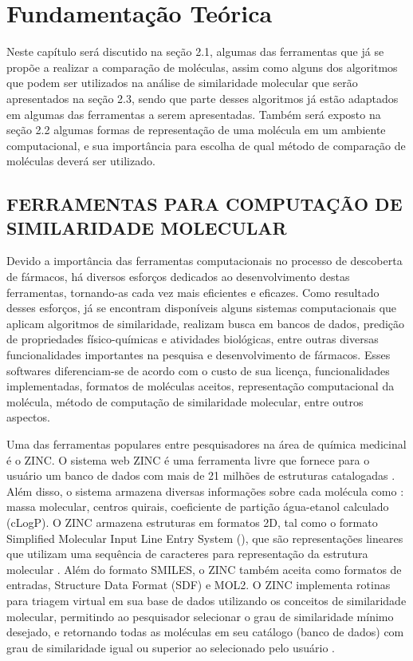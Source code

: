 
\chapter{Fundamentação Teórica}
\label{chap:fundam}
Neste capítulo será discutido na seção 2.1, algumas das ferramentas que já se propõe a realizar
a comparação de moléculas, assim como alguns dos algoritmos que podem ser utilizados na 
análise de similaridade molecular que serão apresentados na seção 2.3, sendo que parte desses 
algoritmos já estão adaptados em algumas das ferramentas a serem apresentadas.
Também será exposto na seção 2.2 algumas formas de representação de uma molécula em um 
ambiente computacional, e sua importância para escolha de qual método de comparação de 
moléculas deverá ser utilizado.
\newpage
\section{FERRAMENTAS PARA COMPUTAÇÃO DE SIMILARIDADE MOLECULAR}
\setcounter{equation}{1}
Devido a importância das ferramentas computacionais no processo de descoberta de fármacos, há diversos esforços dedicados ao desenvolvimento destas ferramentas, tornando-as cada vez mais eficientes e eficazes. Como resultado desses esforços, já se encontram disponíveis alguns sistemas computacionais que aplicam algoritmos de similaridade, realizam busca em bancos de dados, predição de propriedades físico-químicas e atividades biológicas, entre outras diversas funcionalidades importantes na pesquisa e desenvolvimento de fármacos. Esses softwares diferenciam-se de acordo com o custo de sua licença, funcionalidades implementadas, formatos de moléculas aceitos, representação computacional da molécula, método de computação de similaridade molecular, entre outros aspectos.

Uma das ferramentas populares entre pesquisadores na área de química medicinal é o ZINC. O sistema web ZINC é uma ferramenta livre que fornece para o usuário um banco de dados com mais de 21 milhões de estruturas catalogadas \cite{irwin2005zinc}. Além disso, o sistema armazena diversas informações  sobre cada molécula como : massa molecular, centros quirais, coeficiente de partição água-etanol calculado (cLogP). O ZINC armazena estruturas em formatos 2D, tal como o formato Simplified Molecular Input Line Entry System (), que são representações lineares que utilizam uma sequência de caracteres para representação da estrutura molecular \cite{kumar2012}. Além do formato SMILES, o ZINC também aceita como formatos de entradas, Structure Data Format (SDF) e MOL2. O ZINC implementa rotinas para triagem virtual em sua base de dados utilizando os conceitos de similaridade molecular, permitindo ao pesquisador selecionar o grau de similaridade mínimo desejado, e retornando todas as moléculas em seu catálogo (banco de dados) com grau de similaridade igual ou superior ao selecionado pelo usuário \cite{irwin2005zinc}.

